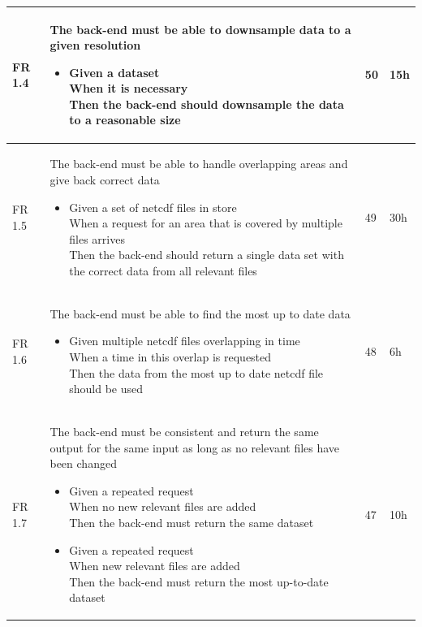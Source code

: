 \documentclass[11pt,a4paper,titlepage,oneside]{report}
\begin{document}
\begin{longtable}{p{1.4cm} p{7.8cm} p{1cm} p{1cm} }
  FR 1.4 & The back-end must be able to downsample data to a given resolution 
  \begin{itemize}
  \item \parbox[t]{6.8cm}{
        Given a dataset \\ 
        When it is necessary \\ 
        Then the back-end should downsample the data to a reasonable size}
  \end{itemize}
  & 50 & 15h \\ \hline

  FR 1.5 & The back-end must be able to handle overlapping areas and give back correct data
  \begin{itemize}
  \item \parbox[t]{6.8cm}{
        Given a set of \gls{netcdf} files in store \\
        When a request for an area that is covered by multiple files arrives \\
        Then the back-end should return a single data set with the correct data from all relevant files}
  \end{itemize}
  & 49 & 30h \\ \hline

  FR 1.6 & The back-end must be able to find the most up to date data
  \begin{itemize}
  \item \parbox[t]{6.8cm}{
        Given multiple \gls{netcdf} files overlapping in time \\
        When a time in this overlap is requested \\
        Then the data from the most up to date \gls{netcdf} file should be used}
  \end{itemize}
  & 48 & 6h \\ \hline

  FR 1.7 & The back-end must be consistent and return the same output for the same input as long as no relevant files have been changed
  \begin{itemize}
  \item \parbox[t]{6.8cm}{
        Given a repeated request \\
        When no new relevant files are added \\
        Then the back-end must return the same dataset}
  \item \parbox[t]{6.8cm}{
        Given a repeated request \\
        When new relevant files are added \\
        Then the back-end must return the most up-to-date dataset}
  \end{itemize}
  & 47 & 10h \\ \hline


\end{longtable}
\end{document}
